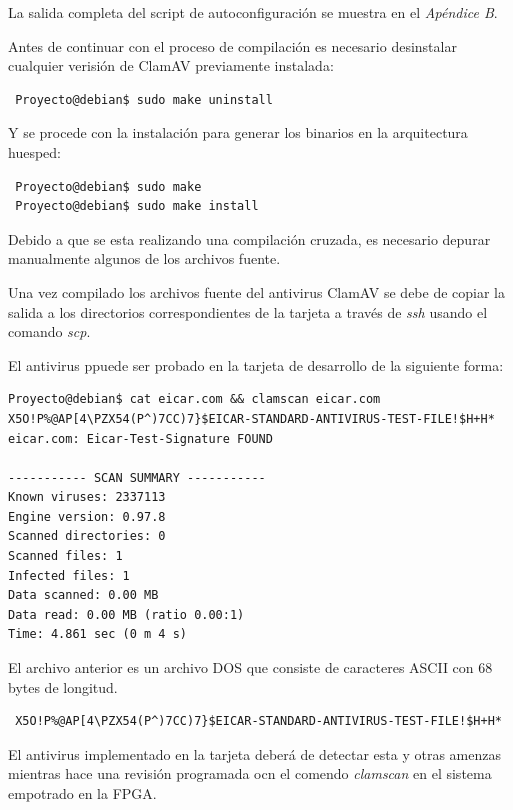 La salida completa del script  de autoconfiguración se muestra en el 
\emph{Apéndice B}.


Antes de continuar con el proceso de compilación es necesario desinstalar 
cualquier  verisión de ClamAV previamente instalada:

\begin{verbatim}
 Proyecto@debian$ sudo make uninstall
\end{verbatim}

Y se procede con la instalación para generar los binarios en la arquitectura 
huesped:

\begin{verbatim}
 Proyecto@debian$ sudo make
 Proyecto@debian$ sudo make install
\end{verbatim}


Debido a que se esta realizando una  compilación cruzada, es necesario depurar 
manualmente algunos de los archivos fuente.

Una vez  compilado los archivos fuente del antivirus ClamAV se debe de copiar 
la salida a los directorios correspondientes de la tarjeta a través de 
\emph{ssh} usando el comando  \emph{scp}.


El  antivirus ppuede ser probado en la tarjeta de desarrollo de la siguiente  
forma:

\begin{verbatim}
Proyecto@debian$ cat eicar.com && clamscan eicar.com 
X5O!P%@AP[4\PZX54(P^)7CC)7}$EICAR-STANDARD-ANTIVIRUS-TEST-FILE!$H+H*
eicar.com: Eicar-Test-Signature FOUND

----------- SCAN SUMMARY -----------
Known viruses: 2337113
Engine version: 0.97.8
Scanned directories: 0
Scanned files: 1
Infected files: 1
Data scanned: 0.00 MB
Data read: 0.00 MB (ratio 0.00:1)
Time: 4.861 sec (0 m 4 s)
\end{verbatim}


El archivo anterior es un archivo DOS que consiste de caracteres ASCII con 
68 bytes de longitud.

\begin{verbatim}
 X5O!P%@AP[4\PZX54(P^)7CC)7}$EICAR-STANDARD-ANTIVIRUS-TEST-FILE!$H+H*
\end{verbatim}


El antivirus  implementado  en la tarjeta deberá de  detectar esta y otras 
amenzas mientras  hace  una revisión programada ocn el comendo \emph{clamscan} 
en el sistema empotrado en la FPGA.













